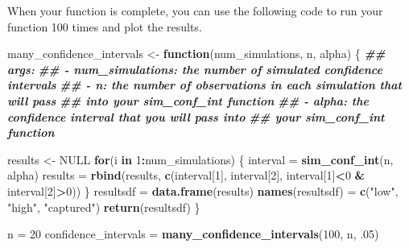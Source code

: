 \documentclass[
]{book}
\newenvironment{Shaded}{\begin{snugshade}}{\end{snugshade}}
\newcommand{\ConstantTok}[1]{\textcolor[rgb]{0.56,0.35,0.01}{#1}}
\newcommand{\ControlFlowTok}[1]{\textcolor[rgb]{0.13,0.29,0.53}{\textbf{#1}}}
\newcommand{\DecValTok}[1]{\textcolor[rgb]{0.00,0.00,0.81}{#1}}
\newcommand{\DocumentationTok}[1]{\textcolor[rgb]{0.56,0.35,0.01}{\textbf{\textit{#1}}}}
\newcommand{\FunctionTok}[1]{\textcolor[rgb]{0.13,0.29,0.53}{\textbf{#1}}}
\newcommand{\NormalTok}[1]{#1}
\newcommand{\OtherTok}[1]{\textcolor[rgb]{0.56,0.35,0.01}{#1}}
\newcommand{\SpecialCharTok}[1]{\textcolor[rgb]{0.81,0.36,0.00}{\textbf{#1}}}
\newcommand{\StringTok}[1]{\textcolor[rgb]{0.31,0.60,0.02}{#1}}
\theoremstyle{definition}
\theoremstyle{definition}
\theoremstyle{definition}
\theoremstyle{definition}
\theoremstyle{remark}
\begin{document}
When your function is complete, you can use the following code to run your function 100 times and plot the results.

\begin{Shaded}
\begin{Highlighting}[]
\NormalTok{many\_confidence\_intervals }\OtherTok{\textless{}{-}} \ControlFlowTok{function}\NormalTok{(num\_simulations, n, alpha) \{}
  \DocumentationTok{\#\# args: }
  \DocumentationTok{\#\#  {-} num\_simulations: the number of simulated confidence intervals }
  \DocumentationTok{\#\#  {-} n: the number of observations in each simulation that will pass }
  \DocumentationTok{\#\#           into your \textasciigrave{}sim\_conf\_int\textasciigrave{} function}
  \DocumentationTok{\#\#  {-} alpha: the confidence interval that you will pass into }
  \DocumentationTok{\#\#           your \textasciigrave{}sim\_conf\_int\textasciigrave{} function}
  
\NormalTok{  results }\OtherTok{\textless{}{-}} \ConstantTok{NULL}
  \ControlFlowTok{for}\NormalTok{(i }\ControlFlowTok{in} \DecValTok{1}\SpecialCharTok{:}\NormalTok{num\_simulations) \{}
\NormalTok{    interval }\OtherTok{=} \FunctionTok{sim\_conf\_int}\NormalTok{(n, alpha)}
\NormalTok{    results }\OtherTok{=} \FunctionTok{rbind}\NormalTok{(results, }\FunctionTok{c}\NormalTok{(interval[}\DecValTok{1}\NormalTok{], interval[}\DecValTok{2}\NormalTok{], interval[}\DecValTok{1}\NormalTok{]}\SpecialCharTok{\textless{}}\DecValTok{0} \SpecialCharTok{\&}\NormalTok{ interval[}\DecValTok{2}\NormalTok{]}\SpecialCharTok{\textgreater{}}\DecValTok{0}\NormalTok{))}
\NormalTok{  \}}
\NormalTok{  resultsdf }\OtherTok{=} \FunctionTok{data.frame}\NormalTok{(results)}
  \FunctionTok{names}\NormalTok{(resultsdf) }\OtherTok{=} \FunctionTok{c}\NormalTok{(}\StringTok{"low"}\NormalTok{, }\StringTok{"high"}\NormalTok{, }\StringTok{"captured"}\NormalTok{)}
  \FunctionTok{return}\NormalTok{(resultsdf)}
\NormalTok{\}}

\NormalTok{n }\OtherTok{=} \DecValTok{20}
\NormalTok{confidence\_intervals }\OtherTok{=} \FunctionTok{many\_confidence\_intervals}\NormalTok{(}\DecValTok{100}\NormalTok{, n, .}\DecValTok{05}\NormalTok{)}
\end{Highlighting}
\end{Shaded}
\end{document}
